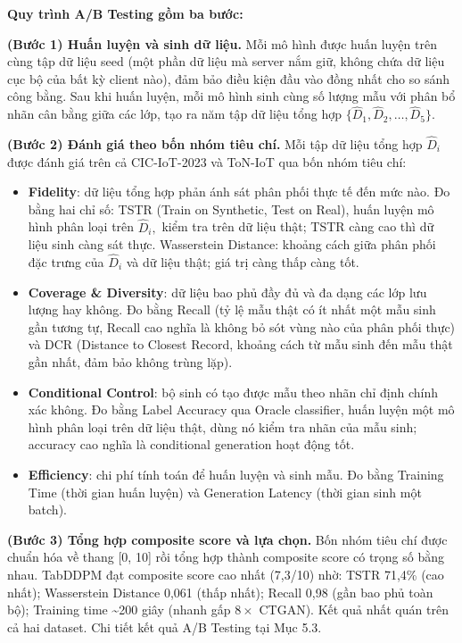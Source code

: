 \textbf{Quy trình A/B Testing gồm ba bước:}

\textbf{(Bước 1) Huấn luyện và sinh dữ liệu.} Mỗi mô hình được huấn luyện trên cùng tập dữ liệu seed (một phần dữ liệu mà server nắm giữ, không chứa dữ liệu cục bộ của bất kỳ client nào), đảm bảo điều kiện đầu vào đồng nhất cho so sánh công bằng. Sau khi huấn luyện, mỗi mô hình sinh cùng số lượng mẫu với phân bổ nhãn cân bằng giữa các lớp, tạo ra năm tập dữ liệu tổng hợp $\{\hat{D}_{1}, \hat{D}_{2}, \ldots, \hat{D}_{5}\}$.

\textbf{(Bước 2) Đánh giá theo bốn nhóm tiêu chí.} Mỗi tập dữ liệu tổng hợp $\hat{D}_{i}$ được đánh giá trên cả CIC-IoT-2023 và ToN-IoT qua bốn nhóm tiêu chí:

\begin{itemize}
\item
  \textbf{Fidelity}: dữ liệu tổng hợp phản ánh sát phân phối thực tế đến mức nào. Đo bằng hai chỉ số: TSTR (Train on Synthetic, Test on Real), huấn luyện mô hình phân loại trên $\hat{D}_{i},$ kiểm tra trên dữ liệu thật; TSTR càng cao thì dữ liệu sinh càng sát thực. Wasserstein Distance: khoảng cách giữa phân phối đặc trưng của $\hat{D}_{i}$ và dữ liệu thật; giá trị càng thấp càng tốt.
\item
  \textbf{Coverage \& Diversity}: dữ liệu bao phủ đầy đủ và đa dạng các lớp lưu lượng hay không. Đo bằng Recall (tỷ lệ mẫu thật có ít nhất một mẫu sinh gần tương tự, Recall cao nghĩa là không bỏ sót vùng nào của phân phối thực) và DCR (Distance to Closest Record, khoảng cách từ mẫu sinh đến mẫu thật gần nhất, đảm bảo không trùng lặp).
\item
  \textbf{Conditional Control}: bộ sinh có tạo được mẫu theo nhãn chỉ định chính xác không. Đo bằng Label Accuracy qua Oracle classifier, huấn luyện một mô hình phân loại trên dữ liệu thật, dùng nó kiểm tra nhãn của mẫu sinh; accuracy cao nghĩa là conditional generation hoạt động tốt.
\item
  \textbf{Efficiency}: chi phí tính toán để huấn luyện và sinh mẫu. Đo bằng Training Time (thời gian huấn luyện) và Generation Latency (thời gian sinh một batch).
\end{itemize}

\textbf{(Bước 3) Tổng hợp composite score và lựa chọn.} Bốn nhóm tiêu chí được chuẩn hóa về thang {[}0, 10{]} rồi tổng hợp thành composite score có trọng số bằng nhau. TabDDPM đạt composite score cao nhất (7,3/10) nhờ: TSTR 71,4\% (cao nhất); Wasserstein Distance 0,061 (thấp nhất); Recall 0,98 (gần bao phủ toàn bộ); Training time \textasciitilde200 giây (nhanh gấp $8\times$ CTGAN). Kết quả nhất quán trên cả hai dataset. Chi tiết kết quả A/B Testing tại Mục 5.3.

